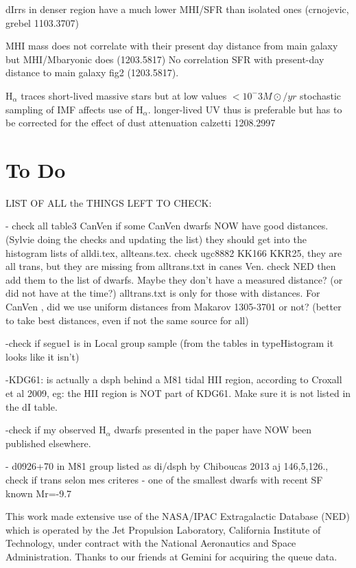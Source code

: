 \documentclass[12pt,preprint]{emulateapj}
\begin{document}
dIrrs in denser region have a much lower MHI/SFR than isolated ones (crnojevic, grebel 1103.3707)

MHI mass does not correlate with their present day distance from main galaxy but MHI/Mbaryonic does (1203.5817)
No correlation SFR with present-day distance to main galaxy fig2 (1203.5817).

H$_\alpha$ traces short-lived massive stars but at low values $<10^-3 M\odot/yr$ stochastic sampling of IMF affects use of H$_\alpha$. longer-lived UV thus 
is preferable but has to be corrected for the effect of dust attenuation calzetti 1208.2997



\section{To Do}

LIST OF ALL the THINGS LEFT TO CHECK:

- check all table3 CanVen if some CanVen dwarfs NOW have good distances. (Sylvie doing the checks and updating the list) they should get into 
the histogram lists of alldi.tex, allteans.tex. check ugc8882 KK166 KKR25, they are all trans, but they are missing from alltrans.txt in canes Ven. 
check NED then add them to the list of dwarfs. Maybe they don't have a measured distance? (or did not have at the time?) alltrans.txt is only for 
those with distances. For CanVen , did we use uniform distances from Makarov 1305-3701 or not? (better to take best distances, even if not the 
same source for all)

-check if segue1 is in Local group sample (from the tables in typeHistogram it looks like it isn't)

-KDG61: is actually a dsph behind a M81 tidal HII region, according to Croxall et al 2009, eg: the HII region is NOT part of KDG61. Make sure it is not listed in the dI table.

-check if my observed H$_\alpha$ dwarfs presented in the paper have NOW been published elsewhere.

- d0926+70 in M81 group listed as di/dsph by Chiboucas 2013 aj 146,5,126., check if trans selon mes criteres - one of the smallest dwarfs with recent SF known Mr=-9.7

\acknowledgments

This work made extensive use of the NASA/IPAC Extragalactic Database (NED) which is operated by the Jet Propulsion Laboratory, California Institute of Technology, 
under contract with the National Aeronautics and Space Administration. Thanks to our friends at Gemini for acquiring the queue data.
\end{document}
